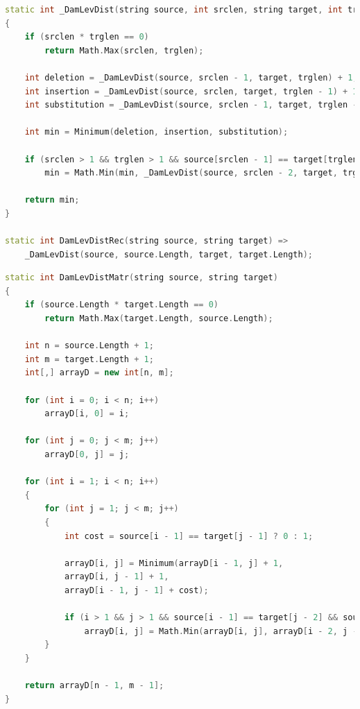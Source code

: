 \documentclass{report}
\begin{document}
\begin{lstlisting}[label=code4,caption=Функция для рекурсивного нахождения расстояния Дамерау-Левенштейна,language=C++]
static int _DamLevDist(string source, int srclen, string target, int trglen)
{
	if (srclen * trglen == 0)
		return Math.Max(srclen, trglen);
	
	int deletion = _DamLevDist(source, srclen - 1, target, trglen) + 1;
	int insertion = _DamLevDist(source, srclen, target, trglen - 1) + 1;
	int substitution = _DamLevDist(source, srclen - 1, target, trglen - 1) + (source[srclen - 1] != target[trglen - 1] ? 1 : 0);
	
	int min = Minimum(deletion, insertion, substitution);
	
	if (srclen > 1 && trglen > 1 && source[srclen - 1] == target[trglen - 2] && source[srclen - 2] == target[trglen - 1])
		min = Math.Min(min, _DamLevDist(source, srclen - 2, target, trglen - 2) + 1);
	
	return min;
}

static int DamLevDistRec(string source, string target) =>
	_DamLevDist(source, source.Length, target, target.Length);

\end{lstlisting}
\newpage
\begin{lstlisting}[label=code5,caption=Функция для нерекурсивного нахождения расстояния Дамерау-Левенштейна с кэшем в виде матрицы, language=C++]
static int DamLevDistMatr(string source, string target)
{
	if (source.Length * target.Length == 0)
		return Math.Max(target.Length, source.Length);
	
	int n = source.Length + 1;
	int m = target.Length + 1;
	int[,] arrayD = new int[n, m];
	
	for (int i = 0; i < n; i++)
		arrayD[i, 0] = i;
	
	for (int j = 0; j < m; j++)
		arrayD[0, j] = j;
	
	for (int i = 1; i < n; i++)
	{
		for (int j = 1; j < m; j++)
		{
			int cost = source[i - 1] == target[j - 1] ? 0 : 1;
			
			arrayD[i, j] = Minimum(arrayD[i - 1, j] + 1,
			arrayD[i, j - 1] + 1,
			arrayD[i - 1, j - 1] + cost);
			
			if (i > 1 && j > 1 && source[i - 1] == target[j - 2] && source[i - 2] == target[j - 1])
				arrayD[i, j] = Math.Min(arrayD[i, j], arrayD[i - 2, j - 2] + cost);
		}
	}
	
	return arrayD[n - 1, m - 1];
}
\end{lstlisting}
\end{document}
